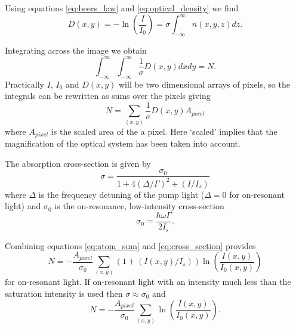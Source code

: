 Using equations \ref{eq:beers_law} and \ref{eq:optical_density} we find
\begin{equation}
D(x, y) = -\ln(\frac{I}{I_0}) = \sigma \int_{-\infty}^{\infty} n(x, y, z) dz.
\end{equation}

Integrating across the image we obtain
\begin{equation}
\int_{-\infty}^{\infty} \int_{-\infty}^{\infty} \frac{1}{\sigma}D(x, y) dx dy = N.
\end{equation}
Practically $I$, $I_0$ and $D(x, y)$ will be two dimensional arrays of pixels, so the integrals can be rewritten as sums over the pixels giving
\begin{equation}\label{eq:atom_sum}
N = \sum_{(x, y)} \frac{1}{\sigma}D(x, y)A_{pixel}
\end{equation}
where $A_{pixel}$ is the scaled area of the a pixel. Here `scaled' implies that the magnification of the optical system has been taken into account.

The absorption cross-section is given by \cite{steck_rubidium_2001}
\begin{equation}\label{eq:cross_section}
\sigma = \frac{\sigma_0}{1+4(\Delta/\Gamma)^2 + (I/I_s)}
\end{equation}
where $\Delta$ is the frequency detuning of the pump light ($\Delta=0$ for on-resonant light) and $\sigma_0$ is the on-resonance, low-intensity  cross-section
\begin{equation}
\sigma_0 = \frac{\hbar\omega\Gamma}{2I_s}.
\end{equation}

Combining equations \ref{eq:atom_sum} and \ref{eq:cross_section} provides
\begin{equation}
\label{eq:atom_count}
N = -\frac{A_{pixel}}{\sigma_0} \sum_{(x, y)} (1+(I(x, y)/I_s)) \ln\left(\frac{I(x, y)}{I_0(x, y)}\right)
\end{equation}
for on-resonant light. If on-resonant light with an intensity much less than the saturation intensity is used then $\sigma \approx \sigma_0$ and
\begin{equation}
N = -\frac{A_{pixel}}{\sigma_0} \sum_{(x, y)} \ln\left(\frac{I(x, y)}{I_0(x, y)}\right).
\end{equation}

